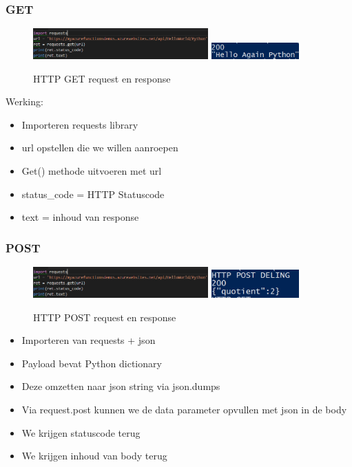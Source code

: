 \documentclass{article}
\begin{document}
\subsubsection{GET}

\begin{figure}[H]
    \centering
    \includegraphics[width=0.6\textwidth]{rpi-request.png}
    \includegraphics[width=0.3\textwidth]{rpi-response.png}
    \caption{HTTP GET request en response}
\end{figure}

Werking: 
\begin{itemize}
    \item Importeren requests library
    \item url opstellen die we willen aanroepen
    \item Get() methode uitvoeren met url
    \item status\_code = HTTP Statuscode
    \item text = inhoud van response
\end{itemize}

\subsubsection{POST}

\begin{figure}[H]
    \centering
    \includegraphics[width=0.6\textwidth]{rpi-request.png}
    \includegraphics[width=0.3\textwidth]{rpi-response2.png}
    \caption{HTTP POST request en response}
\end{figure}

\begin{itemize}
    \item Importeren van requests + json
    \item Payload bevat Python dictionary
    \item Deze omzetten naar json string via json.dumps
    \item Via request.post kunnen we de data parameter opvullen met json in de body
    \item We krijgen statuscode terug
    \item We krijgen inhoud van body terug
\end{itemize}
\end{document}

